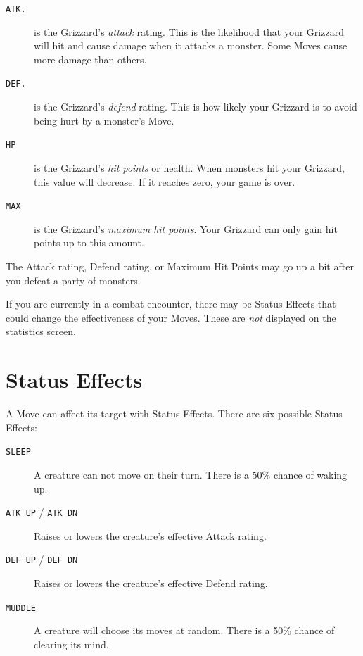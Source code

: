 \documentclass[10pt,twocolumn,openany,article]{memoir}
\begin{document}
\begin{description}
  
\item[\texttt{ATK.}] is the Grizzard's  \emph{attack} rating. This is the
  likelihood  that your  Grizzard  will  hit and  cause  damage when  it
  attacks a monster. Some Moves cause more damage than others.
  
\item[\texttt{DEF.}] is the Grizzard's \emph{defend} rating. This is how
  likely your Grizzard is to avoid being hurt by a monster's Move.

\item[\texttt{HP}]  is  the  Grizzard's  \emph{hit  points}  or  health.
  When  monsters hit  your Grizzard,  this  value will  decrease. If  it
  reaches zero, your game is over.

\item[\texttt{MAX}]  is   the  Grizzard's  \emph{maximum   hit  points}.
  Your Grizzard can only gain hit points up to this amount.
  
\end{description}

The Attack rating, Defend rating, or Maximum  Hit Points may go up a bit
after you defeat a party of monsters.

If you are currently in a  combat encounter, there may be Status Effects
that could change the effectiveness  of your Moves. These are \emph{not}
displayed on the statistics screen.

\section{Status Effects}\label{sec:StatusEffects}

A Move can affect its target with Status Effects. There are six possible
Status Effects:

\begin{description}
\item[\texttt{SLEEP}] A  creature can not  move on their turn.  There is
  a 50\% chance of waking up.
\item[\texttt{ATK UP} / \texttt{ATK DN}] Raises or lowers the creature's
  effective Attack rating.
\item[\texttt{DEF UP} / \texttt{DEF DN}] Raises or lowers the creature's
  effective Defend rating.
\item[\texttt{MUDDLE}]  A  creature will  choose  its  moves at  random.
  There is a 50\% chance of clearing its mind.
\end{description}
\end{document}
